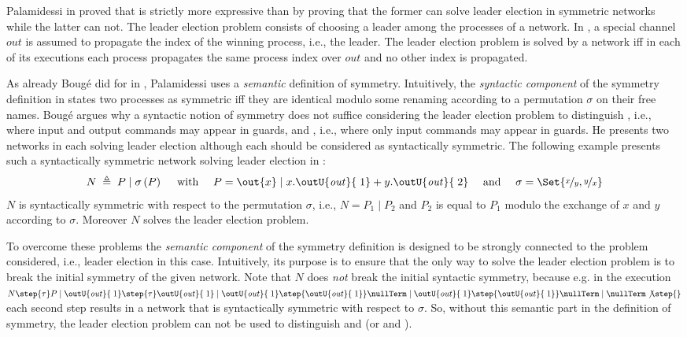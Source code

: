 \documentclass[11pt,techReport]{eptcs}
\begin{document}
Palamidessi in \cite{palamidessi03} proved that \pimix is strictly more expressive than \pisep by proving that the former can solve leader election in symmetric networks while the latter can not. The leader election problem consists of choosing a leader among the processes of a network. In \cite{palamidessi03}, a special channel $ \mathit{out} $ is assumed to propagate the index of the winning process, i.e., the leader. The leader election problem is solved by a network iff in each of its executions each process propagates the same process index over $ \mathit{out} $ and no other index is propagated.

As already Boug\'{e} did for \csp in \cite{bouge88}, Palamidessi uses a \emph{semantic} definition of symmetry.  Intuitively, the \emph{syntactic component} of the symmetry definition in \cite{bouge88, palamidessi03, vigliottiPhillipsPalamidessi07} states two processes as symmetric iff they are identical modulo some renaming according to a permutation $ \sigma $ on their free names. Boug\'{e} \cite{bouge88} argues why a syntactic notion of symmetry does not suffice considering the leader election problem to distinguish \cspmix, i.e., \csp where input and output commands may appear in guards, and \cspin, i.e., \csp where only input commands may appear in guards. He presents two networks in \cspin each solving leader election although each should be considered as syntactically symmetric. The following example presents such a syntactically symmetric network solving leader election in \pisep:
\begin{align}
	N \; \triangleq \; P \mid \sigma\left( P \right) \quad \text{ with } \quad P = \out{x} \mid x.\outU{\mathit{out}}{\; 1} + y.\outU{\mathit{out}}{\; 2} \quad \text{ and } \quad \sigma = \Set{ \nicefrac{x}{y}, \nicefrac{y}{x} } \label{exm:symSolLE}
\end{align}
$ N $ is syntactically symmetric with respect to the permutation $ \sigma $, i.e., $ N = P_1 \mid P_2 $ and $ P_2 $ is equal to $ P_1 $ modulo the exchange of $ x $ and $ y $ according to $ \sigma $. Moreover $ N $ solves the leader election problem.

To overcome these problems the \emph{semantic component} of the symmetry definition is designed to be strongly connected to the problem considered, i.e., leader election in this case. Intuitively, its purpose is to ensure that the only way to solve the leader election problem is to break the initial symmetry of the given network. Note that $ N $ does \emph{not} break the initial syntactic symmetry, because e.g. in the execution $ N \step{\tau} P \mid \outU{\mathit{out}}{\; 1} \step{\tau} \outU{\mathit{out}}{\; 1} \mid \outU{\mathit{out}}{\; 1} \step{\outU{\mathit{out}}{\; 1}} \nullTerm \mid \outU{\mathit{out}}{\; 1} \step{\outU{\mathit{out}}{\; 1}} \nullTerm \mid \nullTerm \not\step{} $ each second step results in a network that is syntactically symmetric with respect to $ \sigma $.  So, without this semantic part in the definition of symmetry, the leader election problem can not be used to distinguish \pimix and \pisep (or \cspmix and \cspin).
\end{document}
